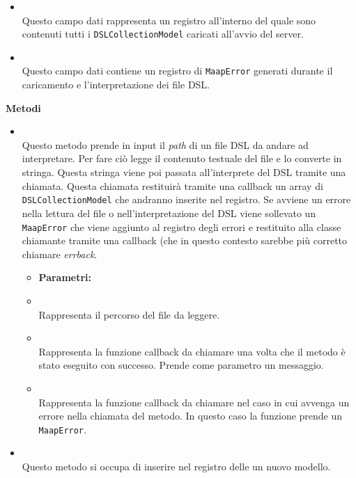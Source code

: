 \begin{itemize}
\item[] \textbf{} \\ Questo campo dati rappresenta un registro all'interno del quale sono contenuti tutti i \texttt{DSLCollectionModel} caricati all'avvio del server.
\item[] \textbf{} \\ Questo campo dati contiene un registro di \texttt{MaapError} generati durante il caricamento e l'interpretazione dei file DSL.
\end{itemize}
\textbf{Metodi}
\begin{itemize}
\item[] \textbf{} \\ Questo metodo prende in input il \textit{path} di un file DSL da andare ad interpretare. Per fare ciò legge il contenuto testuale del file e lo converte in stringa. Questa stringa viene poi passata all'interprete del DSL tramite una chiamata. Questa chiamata restituirà tramite una callback un array di \texttt{DSLCollectionModel} che andranno inserite nel registro. Se avviene un errore nella lettura del file o nell'interpretazione del DSL viene sollevato un \texttt{MaapError} che viene aggiunto al registro degli errori e restituito alla classe chiamante tramite una callback (che in questo contesto sarebbe più corretto chiamare \textit{errback}.
\begin{itemize}\addtolength{\itemsep}{-0.5\baselineskip}
\item[] \textbf{Parametri:}
\item[]  \\ Rappresenta il percorso del file da leggere.
\item[]  \\ Rappresenta la funzione callback da chiamare una volta che il metodo è stato eseguito con successo. Prende come parametro un messaggio.
\item[]  \\ Rappresenta la funzione callback da chiamare nel caso in cui avvenga un errore nella chiamata del metodo. In questo caso la funzione prende un \texttt{MaapError}.
\end{itemize}
\item[] \textbf{} \\ Questo metodo si occupa di inserire nel registro delle  un nuovo modello.

\end{itemize}
